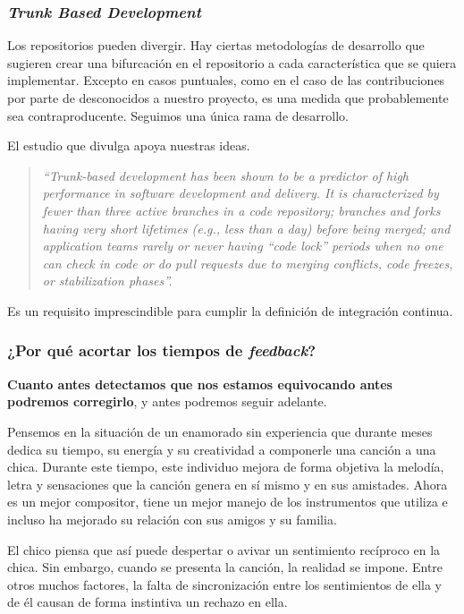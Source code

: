 \subsubsection{\textit{Trunk Based Development}}

Los repositorios pueden divergir. Hay ciertas metodologías de desarrollo que
sugieren crear una bifurcación en el repositorio a cada característica que se
quiera implementar. Excepto en casos puntuales, como en el caso de las
contribuciones por parte de desconocidos a nuestro proyecto, es una medida que
probablemente sea contraproducente. Seguimos una única rama de desarrollo.

El estudio que divulga \cite{accelerate} apoya nuestras ideas.

\begin{quote}
    \textit{%
    ``Trunk-based development has been shown to be a predictor of high
    performance in software development and delivery. It is characterized
    by fewer than three active branches in a code repository; branches and
    forks having very short lifetimes (e.g., less than a day) before being
    merged; and application teams rarely or never having “code lock” periods
    when no one can check in code or do pull requests due to merging conflicts,
    code freezes, or stabilization phases''.
    }
\end{quote}

Es un requisito imprescindible para cumplir la definición de integración continua.
\cite{minimumViableCD}

\subsubsection{¿Por qué acortar los tiempos de \textit{feedback}?}

\textbf{Cuanto antes detectamos que nos estamos equivocando
antes podremos corregirlo}, y antes podremos seguir adelante.

Pensemos en la situación de un enamorado sin experiencia que durante meses dedica su
tiempo, su energía y su creatividad a componerle una canción a una chica.
Durante este tiempo, este individuo mejora de forma objetiva la
melodía, letra y sensaciones que la canción genera en sí mismo
y en sus amistades. Ahora es un mejor compositor, tiene un mejor manejo
de los instrumentos que utiliza e incluso ha mejorado su
relación con sus amigos y su familia.

El chico piensa que así puede despertar o avivar un sentimiento recíproco
en la chica. Sin embargo, cuando se presenta la canción,
la realidad se impone. Entre otros muchos factores,
la falta de sincronización entre los sentimientos de ella y de él causan
de forma instintiva un rechazo en ella.

